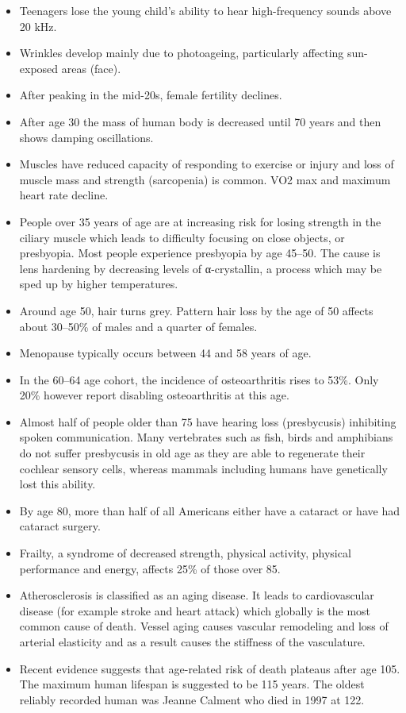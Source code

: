 \begin{itemize}
\tightlist
\item
  Teenagers lose the young child's ability to hear high-frequency sounds above 20 kHz.
\item
  Wrinkles develop mainly due to photoageing, particularly affecting sun-exposed areas (face).
\item
  After peaking in the mid-20s, female fertility declines.
\item
  After age 30 the mass of human body is decreased until 70 years and then shows damping oscillations.
\item
  Muscles have reduced capacity of responding to exercise or injury and loss of muscle mass and strength (sarcopenia) is common. VO2 max and maximum heart rate decline.
\item
  People over 35 years of age are at increasing risk for losing strength in the ciliary muscle which leads to difficulty focusing on close objects, or presbyopia. Most people experience presbyopia by age 45--50. The cause is lens hardening by decreasing levels of α-crystallin, a process which may be sped up by higher temperatures.
\item
  Around age 50, hair turns grey. Pattern hair loss by the age of 50 affects about 30--50\% of males and a quarter of females.
\item
  Menopause typically occurs between 44 and 58 years of age.
\item
  In the 60--64 age cohort, the incidence of osteoarthritis rises to 53\%. Only 20\% however report disabling osteoarthritis at this age.
\item
  Almost half of people older than 75 have hearing loss (presbycusis) inhibiting spoken communication. Many vertebrates such as fish, birds and amphibians do not suffer presbycusis in old age as they are able to regenerate their cochlear sensory cells, whereas mammals including humans have genetically lost this ability.
\item
  By age 80, more than half of all Americans either have a cataract or have had cataract surgery.
\item
  Frailty, a syndrome of decreased strength, physical activity, physical performance and energy, affects 25\% of those over 85.
\item
  Atherosclerosis is classified as an aging disease. It leads to cardiovascular disease (for example stroke and heart attack) which globally is the most common cause of death. Vessel aging causes vascular remodeling and loss of arterial elasticity and as a result causes the stiffness of the vasculature.
\item
  Recent evidence suggests that age-related risk of death plateaus after age 105. The maximum human lifespan is suggested to be 115 years. The oldest reliably recorded human was Jeanne Calment who died in 1997 at 122.
\end{itemize}

